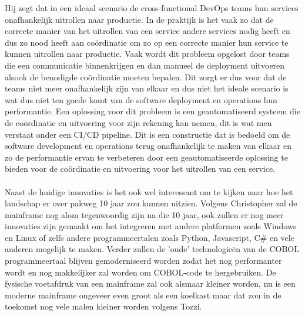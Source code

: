 Hij zegt dat in een ideaal scenario de cross-functional DevOps teams hun services onafhankelijk uitrollen naar productie.
In de praktijk is het vaak zo dat de correcte manier van het uitrollen van een service andere services nodig heeft en dus zo nood heeft aan coördinatie om zo op een correcte manier hun service te kunnen uitrollen naar productie.
Vaak wordt dit probleem opgelost door teams die een communicatie binnenkrijgen en dan manueel de deployment uitvoeren alsook de benodigde coördinatie moeten bepalen.
Dit zorgt er dus voor dat de teams niet meer onafhankelijk zijn van elkaar en dus niet het ideale scenario is wat dus niet ten goede komt van de software deployment en operations hun performantie.
Een oplossing voor dit probleem is een geautomatiseerd systeem die de coördinatie en uitvoering voor zijn rekening kan nemen, dit is wat men verstaat onder een CI/CD pipeline.
Dit is een constructie dat is bedoeld om de software development en operations terug onafhankelijk te maken van elkaar en zo de performantie ervan te verbeteren door een geautomatiseerde oplossing te bieden voor de coördinatie en uitvoering voor het uitrollen van een service. \autocite{Sokolowksi2021}
\\ \\
Naast de huidige innovaties is het ook wel interessant om te kijken naar hoe het landschap er over pakweg 10 jaar zou kunnen uitzien.
Volgens Christopher \textcite{Tozzi2022} zal de mainframe nog alom tegenwoordig zijn na die 10 jaar, ook zullen er nog meer innovaties zijn gemaakt om het integreren met andere platformen zoals Windows en Linux of zelfs andere programmeertalen zoals Python,
Javascript, C# en vele anderen mogelijk te maken.
Verder zullen de 'oude' technologieën van de COBOL programmeertaal blijven gemoderniseerd worden zodat het nog performanter wordt en nog makkelijker zal worden om COBOL-code te hergebruiken. De fysische voetafdruk van een mainframe zal ook alsmaar kleiner worden,
nu is een moderne mainframe ongeveer even groot als een koelkast maar dat zou in de toekomst nog vele malen kleiner worden volgens Tozzi. \autocite{Tozzi2022}




